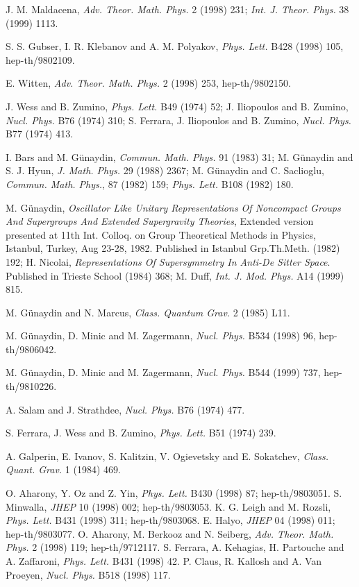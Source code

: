\documentclass[a4paper,12pt]{article}
\begin{document}
\begin{thebibliography}{99}

J. M. Maldacena, {\it  Adv. Theor. Math. Phys.} 2 (1998) 231; {\it  
Int. J. Theor. Phys.} 38 (1999) 1113. 

S. S. Gubser, I. R. Klebanov and A. M. Polyakov, {\it Phys. Lett.} 
B428 (1998) 105, hep-th/9802109. 

E. Witten, {\it Adv. Theor. Math. Phys.} 2 (1998) 253, 
hep-th/9802150. 

 J. Wess and B. Zumino, {\it Phys. Lett.} B49 (1974) 
52; J. Iliopoulos and B. Zumino, {\it Nucl. Phys.} B76 (1974) 310; 
 S. Ferrara,  J. Iliopoulos and B. Zumino, {\it Nucl. Phys.} B77 (1974) 413. 

I. Bars and  M. G\"unaydin, {\it Commun. Math. Phys.} 91 (1983)
31; M. G\"unaydin and S. J. Hyun, {\it J. Math. Phys.} 29 (1988) 2367; M. G\"unaydin and C. Saclioglu, {\it Commun. Math. Phys.}, 87 (1982) 159; {\it Phys. Lett.} B108 (1982) 180.

  M. 
G\"unaydin, {\it Oscillator Like Unitary Representations Of 
Noncompact Groups And Supergroups And Extended Supergravity 
Theories}, Extended version presented at 11th Int. Colloq. on 
Group Theoretical Methods in Physics, Istanbul, Turkey, Aug 23-28, 
1982. Published in Istanbul Grp.Th.Meth. (1982) 192; H. Nicolai, 
{\it Representations Of Supersymmetry In Anti-De Sitter Space}.   
Published in Trieste School (1984) 368; M. Duff, {\it  Int. J. 
Mod. Phys.} A14 (1999) 815. 

M. G\"unaydin and N. Marcus, {\it Class. Quantum Grav.} 2 (1985) 
L11. 

M. G\"unaydin, D. Minic and  M. Zagermann, {\it Nucl. Phys.} B534 
(1998) 96, hep-th/9806042. 

M. G\"unaydin, D. Minic and  M. Zagermann, {\it Nucl. Phys.} B544 
(1999) 737, hep-th/9810226. 

 A. Salam and J. Strathdee, {\it Nucl. Phys.} B76 (1974) 477. 


S. Ferrara, J. Wess and B. Zumino, {\it Phys. Lett.} B51 (1974) 
239.
 
 A. Galperin, E. Ivanov, S. Kalitzin, V. Ogievetsky and
E. Sokatchev, {\it Class. Quant. Grav.} 1 (1984) 469.  

 O. Aharony, Y. Oz and Z. Yin, {\it  Phys. Lett.} 
B430 (1998) 87; hep-th/9803051. 
 S. Minwalla, {\it JHEP} 10 (1998) 002; hep-th/9803053. 
 K. G. Leigh and M. Rozsli, {\it  Phys. Lett.} 
B431 (1998) 311; hep-th/9803068. 
 E. Halyo, {\it JHEP} 04 (1998) 011; hep-th/9803077.
 O. Aharony, M. Berkooz and N. Seiberg, 
{\it  Adv. Theor. Math. Phys.} 2 (1998) 119; hep-th/9712117. 
  S. Ferrara, A. Kehagias, H. Partouche and A. Zaffaroni, 
{\it  Phys. Lett.} B431 (1998) 42. 
P. Claus, R. Kallosh and A. Van Proeyen, {\it Nucl. Phys.} B518 
(1998) 117. 


\end{thebibliography}
\end{document}
